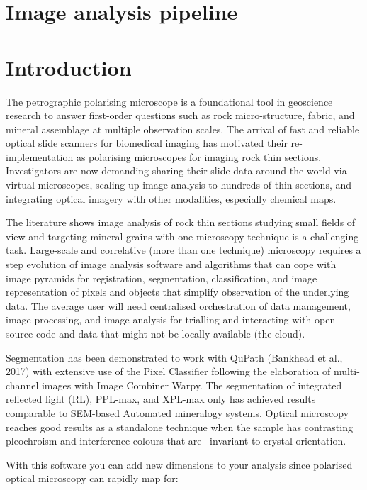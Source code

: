 \section{Image analysis pipeline}
\section{Introduction}
	
	The petrographic polarising microscope is a foundational tool in geoscience research to answer first-order questions such as rock micro-structure, fabric, and mineral assemblage at multiple observation scales. The arrival of fast and reliable optical slide scanners for biomedical imaging has motivated their re-implementation as polarising microscopes for imaging rock thin sections. Investigators are now demanding sharing their slide data around the world via virtual microscopes, scaling up image analysis to hundreds of thin sections, and integrating optical imagery with other modalities, especially chemical maps.
	
	The literature shows image analysis of rock thin sections studying small fields of view and targeting mineral grains with one microscopy technique is a challenging task. Large-scale and correlative (more than one technique) microscopy requires a step evolution of image analysis software and algorithms that can cope with image pyramids for registration, segmentation, classification, and image representation of pixels and objects that simplify observation of the underlying data. The average user will need centralised orchestration of data management, image processing, and image analysis for trialling and interacting with open-source code and data that might not be locally available (the cloud).
	
	Segmentation has been demonstrated to work with QuPath (Bankhead et al., 2017) with extensive use of the Pixel Classifier following the elaboration of multi-channel images with Image Combiner Warpy. The segmentation of integrated reflected light (RL), PPL-max, and XPL-max only has achieved results comparable to SEM-based Automated mineralogy systems. Optical microscopy reaches good results as a standalone technique when the sample has contrasting pleochroism and interference colours that are ~invariant to crystal orientation.
	
	
	With this software you can add new dimensions to your analysis since polarised optical microscopy can rapidly map for:
	
